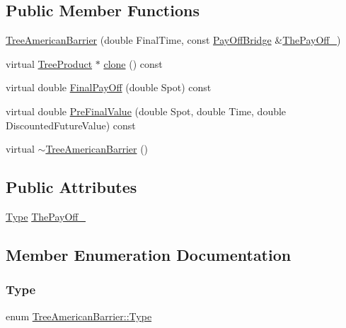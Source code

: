 \subsection*{Public Member Functions}
\begin{DoxyCompactItemize}
\item 
\hyperlink{classTreeAmericanBarrier_a8c87d94ce1a1978d44b36f32d741a79b}{Tree\+American\+Barrier} (double Final\+Time, const \hyperlink{classPayOffBridge}{Pay\+Off\+Bridge} \&\hyperlink{classTreeAmericanBarrier_a30b4998595cdd89426043fc11522f325}{The\+Pay\+Off\+\_\+})
\item 
virtual \hyperlink{classTreeProduct}{Tree\+Product} $\ast$ \hyperlink{classTreeAmericanBarrier_a25a7d1fdcfd55228de1b4f50d0b3943d}{clone} () const
\item 
virtual double \hyperlink{classTreeAmericanBarrier_a55218e00428e49c18186358ae1b54b58}{Final\+Pay\+Off} (double Spot) const
\item 
virtual double \hyperlink{classTreeAmericanBarrier_a66ac7ef18f10dbc5232b7c18e3093805}{Pre\+Final\+Value} (double Spot, double Time, double Discounted\+Future\+Value) const
\item 
virtual \hyperlink{classTreeAmericanBarrier_afe01588c2d43d611877baf510a2ed651}{$\sim$\+Tree\+American\+Barrier} ()
\end{DoxyCompactItemize}
\subsection*{Public Attributes}
\begin{DoxyCompactItemize}
\item 
\hyperlink{classTreeAmericanBarrier_a52c7d9a606b0075d8d1b69c877771cbb}{Type} \hyperlink{classTreeAmericanBarrier_a30b4998595cdd89426043fc11522f325}{The\+Pay\+Off\+\_\+}
\end{DoxyCompactItemize}


\subsection{Member Enumeration Documentation}
\hypertarget{classTreeAmericanBarrier_a52c7d9a606b0075d8d1b69c877771cbb}{}\label{classTreeAmericanBarrier_a52c7d9a606b0075d8d1b69c877771cbb} 
\subsubsection{\texorpdfstring{Type}{Type}}
{\footnotesize\ttfamily enum \hyperlink{classTreeAmericanBarrier_a52c7d9a606b0075d8d1b69c877771cbb}{Tree\+American\+Barrier\+::\+Type}}

